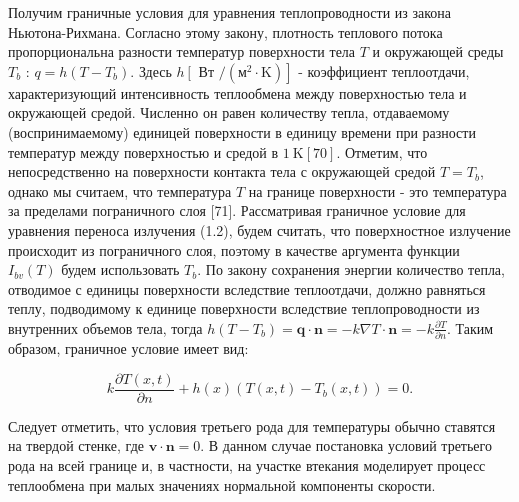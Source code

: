 Получим граничные условия для уравнения теплопроводности из закона Ньютона-Рихмана.
Согласно этому закону, плотность теплового потока пропорциональна разности температур
поверхности тела $T$ и окружающей среды $T_{b}$ : $q=h\left(T-T_{b}\right)$.
Здесь $h\left[\right.$ Вт $\left./\left(\mathrm{м}^{2} \cdot \mathrm{K}\right)\right]$ - коэффициент
теплоотдачи, характеризующий интенсивность теплообмена между поверхностью тела и окружающей средой.
Численно он равен количеству тепла, отдаваемому (воспринимаемому) единицей поверхности в единицу времени
при разности температур между поверхностью и средой в $1 \mathrm{~K}[70]$. Отметим, что непосредственно
на поверхности контакта тела с окружающей средой $T=T_{b}$, однако мы считаем, что температура $T$ на
границе поверхности - это температура за пределами пограничного слоя [71].
Рассматривая граничное условие для уравнения переноса излучения (1.2),
будем считать, что поверхностное излучение происходит из пограничного слоя,
поэтому в качестве аргумента функции $I_{b v}(T)$ будем использовать $T_{b}$.
По закону сохранения энергии количество тепла, отводимое с единицы поверхности
вследствие теплоотдачи, должно равняться теплу, подводимому к единице поверхности
вследствие теплопроводности из внутренних объемов тела, тогда
$h\left(T-T_{b}\right)=\mathbf{q} \cdot \mathbf{n}=-k \nabla T
\cdot \mathbf{n}=-k \frac{\partial T}{\partial n}$.
Таким образом, граничное условие имеет вид:

\[
    k \frac{\partial T(x, t)}{\partial n}+h(x)\left(T(x, t)-T_{b}(x, t)\right)=0 .
\]

Следует отметить, что условия третьего рода для температуры обычно ставятся на твердой стенке,
где $\mathbf{v} \cdot \mathbf{n}=0$.
В данном случае постановка условий третьего рода на всей границе и, в частности,
на участке втекания моделирует процесс теплообмена при малых значениях нормальной компоненты скорости.

